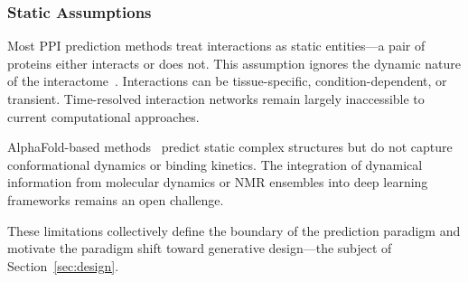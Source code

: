 \subsubsection{Static Assumptions}

Most PPI prediction methods treat interactions as static entities---a pair of proteins either interacts or does not. This assumption ignores the dynamic nature of the interactome~\cite{mcgary2010dynamic}. Interactions can be tissue-specific, condition-dependent, or transient. Time-resolved interaction networks remain largely inaccessible to current computational approaches.

AlphaFold-based methods~\cite{abramson2024alphafold3, evans2022alphafoldmultimer} predict static complex structures but do not capture conformational dynamics or binding kinetics. The integration of dynamical information from molecular dynamics or NMR ensembles into deep learning frameworks remains an open challenge.

\vspace{1em}
\noindent
These limitations collectively define the boundary of the prediction paradigm and motivate the paradigm shift toward generative design---the subject of Section~\ref{sec:design}.
